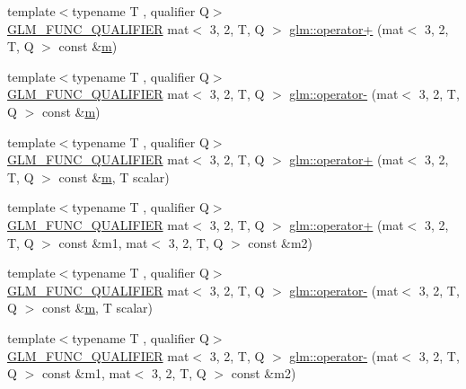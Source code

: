 \begin{DoxyCompactItemize}
\item 
{\footnotesize template$<$typename T , qualifier Q$>$ }\\\mbox{\hyperlink{setup_8hpp_a33fdea6f91c5f834105f7415e2a64407}{G\+L\+M\+\_\+\+F\+U\+N\+C\+\_\+\+Q\+U\+A\+L\+I\+F\+I\+ER}} mat$<$ 3, 2, T, Q $>$ \mbox{\hyperlink{namespaceglm_a00d05fc731c3d1fd422057580f26e9f3}{glm\+::operator+}} (mat$<$ 3, 2, T, Q $>$ const \&\mbox{\hyperlink{_s_d_l__opengl__glext_8h_af593500c283bf1a787a6f947f503a5c2}{m}})
\item 
{\footnotesize template$<$typename T , qualifier Q$>$ }\\\mbox{\hyperlink{setup_8hpp_a33fdea6f91c5f834105f7415e2a64407}{G\+L\+M\+\_\+\+F\+U\+N\+C\+\_\+\+Q\+U\+A\+L\+I\+F\+I\+ER}} mat$<$ 3, 2, T, Q $>$ \mbox{\hyperlink{namespaceglm_a4c4badbd6ef6ab9804d99d755fb8a277}{glm\+::operator-\/}} (mat$<$ 3, 2, T, Q $>$ const \&\mbox{\hyperlink{_s_d_l__opengl__glext_8h_af593500c283bf1a787a6f947f503a5c2}{m}})
\item 
{\footnotesize template$<$typename T , qualifier Q$>$ }\\\mbox{\hyperlink{setup_8hpp_a33fdea6f91c5f834105f7415e2a64407}{G\+L\+M\+\_\+\+F\+U\+N\+C\+\_\+\+Q\+U\+A\+L\+I\+F\+I\+ER}} mat$<$ 3, 2, T, Q $>$ \mbox{\hyperlink{namespaceglm_aaa32473c452e73fc4eb88f03726597c5}{glm\+::operator+}} (mat$<$ 3, 2, T, Q $>$ const \&\mbox{\hyperlink{_s_d_l__opengl__glext_8h_af593500c283bf1a787a6f947f503a5c2}{m}}, T scalar)
\item 
{\footnotesize template$<$typename T , qualifier Q$>$ }\\\mbox{\hyperlink{setup_8hpp_a33fdea6f91c5f834105f7415e2a64407}{G\+L\+M\+\_\+\+F\+U\+N\+C\+\_\+\+Q\+U\+A\+L\+I\+F\+I\+ER}} mat$<$ 3, 2, T, Q $>$ \mbox{\hyperlink{namespaceglm_a7298d6a215681bb8db9d534e6afa6562}{glm\+::operator+}} (mat$<$ 3, 2, T, Q $>$ const \&m1, mat$<$ 3, 2, T, Q $>$ const \&m2)
\item 
{\footnotesize template$<$typename T , qualifier Q$>$ }\\\mbox{\hyperlink{setup_8hpp_a33fdea6f91c5f834105f7415e2a64407}{G\+L\+M\+\_\+\+F\+U\+N\+C\+\_\+\+Q\+U\+A\+L\+I\+F\+I\+ER}} mat$<$ 3, 2, T, Q $>$ \mbox{\hyperlink{namespaceglm_a5199599463fc528e4ee85e8202abdd24}{glm\+::operator-\/}} (mat$<$ 3, 2, T, Q $>$ const \&\mbox{\hyperlink{_s_d_l__opengl__glext_8h_af593500c283bf1a787a6f947f503a5c2}{m}}, T scalar)
\item 
{\footnotesize template$<$typename T , qualifier Q$>$ }\\\mbox{\hyperlink{setup_8hpp_a33fdea6f91c5f834105f7415e2a64407}{G\+L\+M\+\_\+\+F\+U\+N\+C\+\_\+\+Q\+U\+A\+L\+I\+F\+I\+ER}} mat$<$ 3, 2, T, Q $>$ \mbox{\hyperlink{namespaceglm_a34ac4f10148485d75cb6ad599ebe79f7}{glm\+::operator-\/}} (mat$<$ 3, 2, T, Q $>$ const \&m1, mat$<$ 3, 2, T, Q $>$ const \&m2)

\end{DoxyCompactItemize}
